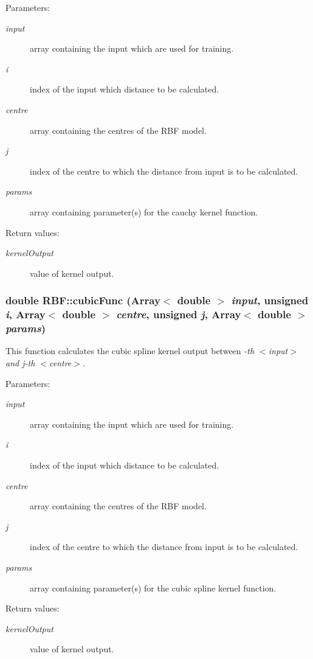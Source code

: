 \begin{Desc}
\item[Parameters:]
\begin{description}
\item[{\em input}]array containing the input which are used for training. \item[{\em i}]index of the input which distance to be calculated. \item[{\em centre}]array containing the centres of the RBF model. \item[{\em j}]index of the centre to which the distance from input is to be calculated. \item[{\em params}]array containing parameter(s) for the cauchy kernel function. \end{description}
\end{Desc}
\begin{Desc}
\item[Return values:]
\begin{description}
\item[{\em kernel\-Output}]value of kernel output.\end{description}
\end{Desc}
\subsubsection{\setlength{\rightskip}{0pt plus 5cm}double RBF::cubic\-Func (Array$<$ double $>$ {\em input}, unsigned {\em i}, Array$<$ double $>$ {\em centre}, unsigned {\em j}, Array$<$ double $>$ {\em params})\hspace{0.3cm}{\tt  [static]}}\label{classRBF_e2}


This function calculates the cubic spline kernel output between {\em -th $<$input$>$ and j-th $<$centre$>$. \/}

\begin{Desc}
\item[Parameters:]
\begin{description}
\item[{\em input}]array containing the input which are used for training. \item[{\em i}]index of the input which distance to be calculated. \item[{\em centre}]array containing the centres of the RBF model. \item[{\em j}]index of the centre to which the distance from input is to be calculated. \item[{\em params}]array containing parameter(s) for the cubic spline kernel function. \end{description}
\end{Desc}
\begin{Desc}
\item[Return values:]
\begin{description}
\item[{\em kernel\-Output}]value of kernel output.\end{description}
\end{Desc}
